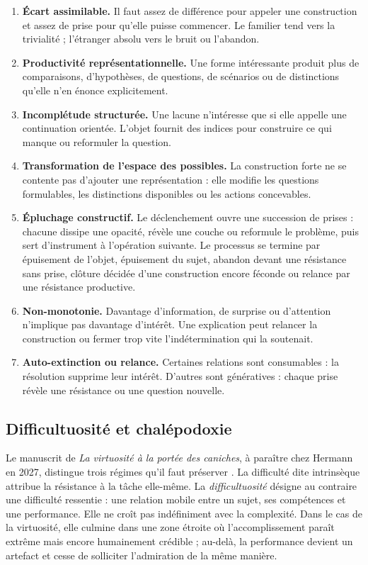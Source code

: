 \documentclass[11pt,a4paper]{article}
\begin{document}
\begin{enumerate}[resume]
  \item \textbf{Écart assimilable.} Il faut assez de différence pour appeler
        une construction et assez de prise pour qu'elle puisse commencer. Le
        familier tend vers la trivialité ; l'étranger absolu vers le bruit ou
        l'abandon.
  \item \textbf{Productivité représentationnelle.} Une forme intéressante
        produit plus de comparaisons, d'hypothèses, de questions, de scénarios
        ou de distinctions qu'elle n'en énonce explicitement.
  \item \textbf{Incomplétude structurée.} Une lacune n'intéresse que si elle
        appelle une continuation orientée. L'objet fournit des indices pour
        construire ce qui manque ou reformuler la question.
  \item \textbf{Transformation de l'espace des possibles.} La construction
        forte ne se contente pas d'ajouter une représentation : elle modifie
        les questions formulables, les distinctions disponibles ou les actions
        concevables.
  \item \textbf{Épluchage constructif.} Le déclenchement ouvre une succession
        de prises : chacune dissipe une opacité, révèle une couche ou reformule
        le problème, puis sert d'instrument à l'opération suivante. Le processus
        se termine par épuisement de l'objet, épuisement du sujet, abandon devant
        une résistance sans prise, clôture décidée d'une construction encore
        féconde ou relance par une résistance productive.
  \item \textbf{Non-monotonie.} Davantage d'information, de surprise ou
        d'attention n'implique pas davantage d'intérêt. Une explication peut
        relancer la construction ou fermer trop vite l'indétermination qui la
        soutenait.
  \item \textbf{Auto-extinction ou relance.} Certaines relations sont
        consumables : la résolution supprime leur intérêt. D'autres sont
        génératives : chaque prise révèle une résistance ou une question
        nouvelle.
\end{enumerate}

\subsection{Difficultuosité et chalépodoxie}

Le manuscrit de \emph{La virtuosité à la portée des caniches}, à paraître chez
Hermann en 2027, distingue trois régimes qu'il faut préserver
\parencite[manuscrit, 13--16]{pachet2027virtuosite}. La difficulté dite
intrinsèque attribue la résistance à la tâche elle-même. La
\emph{difficultuosité} désigne au contraire une difficulté ressentie : une
relation mobile entre un sujet, ses compétences et une performance. Elle ne
croît pas indéfiniment avec la complexité. Dans le cas de la virtuosité, elle
culmine dans une zone étroite où l'accomplissement paraît extrême mais encore
humainement crédible ; au-delà, la performance devient un artefact et cesse de
solliciter l'admiration de la même manière.
\end{document}
